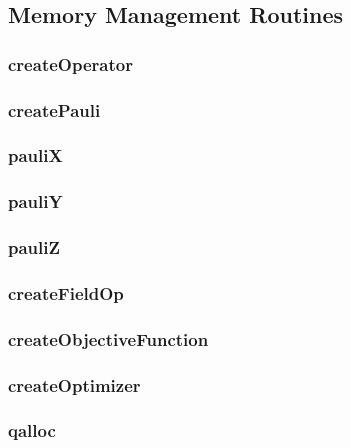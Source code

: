 \documentclass[10pt]{book}
\begin{document}
\subsection{Memory Management Routines}
\subsubsection{\textbf{createOperator}}\label{subsec:createop}


\subsubsection{\textbf{createPauli}}\label{subsec:createpauli}


\subsubsection{\textbf{pauliX}}\label{subsec:paulix}


\subsubsection{\textbf{pauliY}}\label{subsec:pauliy}


\subsubsection{\textbf{pauliZ}}\label{subsec:pauliz}


\subsubsection{\textbf{createFieldOp}}\label{subsec:createfieldop}


\subsubsection{\textbf{createObjectiveFunction}}\label{subsec:createobjfunc}


\subsubsection{\textbf{createOptimizer}}\label{subsec:createoptimizer}


\subsubsection{\textbf{qalloc}}\label{subsec:qalloc}

\end{document}
